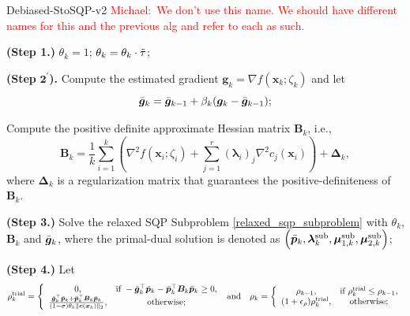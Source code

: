\documentclass[aos]{imsart}
\numberwithin{equation}{section}
\theoremstyle{plain}
\newcommand{\michael}[1]{\textcolor{red}{Michael:\ #1}}
\begin{document}
\begin{algorithm}[htb]
 \caption{Debiased-StoSQP-v2 \michael{We don't use this name. We should have different names for this and the previous alg and refer to each as such.}}
 \label{alg_stoch_relaxed_sqp_averaging_grad_Bk}
 \begin{algorithmic}[1]
 \renewcommand{\algorithmicrequire}{\textbf{Input:} $\bm{\ell} \leq \bm{x}_0 \leq \bm{u}$, $\tau, \Tilde{\tau} \in (0,1)$, $\sigma \in (0,1)$, $\rho_{-1} >0$, $\epsilon_{\rho}, \epsilon_{\xi}, \beta \in (0,1)$, $\mu \in (0,1)$, $\varrho>0$, $\{\beta_k\}_{k=0}^{\infty}$, $\{\gamma_k\}_{k=0}^{\infty}$.}
 \REQUIRE 
  \STATE \textbf{(Step 1.)} $\theta_k = 1$;
  \STATE $\theta_k = \theta_k \cdot \Tilde{\tau}$;

  \ENDWHILE

  \STATE \textbf{(Step} $\mathbf{2^{\prime}}$\textbf{).} Compute the estimated gradient $\bm{g}_k = \nabla f(\bm{x}_k; \zeta_{k})$ and let 
  \begin{equation*}
      \Bar{\bm{g}}_k = \Bar{\bm{g}}_{k-1} + \beta_k (\bm{g}_k - \Bar{\bm{g}}_{k-1});
  \end{equation*}

  \STATE Compute the positive definite approximate Hessian matrix $\bm{B}_k$, i.e., \begin{equation*}
        \bm{B}_k = \frac{1}{k} \sum_{i=1}^{k} \left( \nabla^2 f(\bm{x}_i; \zeta_{i}) + \sum_{j=1}^{r} \left( \bm{\lambda}_{i}\right)_{j}\nabla^2 c_j(\bm{x}_{i})\right) + \bm{\Delta}_k,
\end{equation*}
 where $\bm{\Delta}_k$ is a regularization matrix that guarantees the positive-definiteness of $\bm{B}_k$. 
  
  \STATE \textbf{(Step 3.)} Solve the relaxed SQP Subproblem \eqref{relaxed_sqp_subproblem} with $\theta_k$, $\bm{B}_k$ and $\Bar{\bm{g}}_{k}$, where the primal-dual solution is denoted as $\left(\Bar{\bm{p}}_k,  \bm{\lambda}_k^{\text{sub}}, \bm{\mu}_{1,k}^{\text{sub}}, \bm{\mu}_{2,k}^{\text{sub}} \right)$;

  \STATE \textbf{(Step 4.)} Let \begin{equation*}
        \rho_k^{\text{trial}} = \left \{ \begin{array}{cc}
           0,  & \text{if}~ -\Bar{\bm{g}}_k^{\top} \Bar{\bm{p}}_k - \Bar{\bm{p}}_k^{\top} \bm{B}_k \Bar{\bm{p}}_k \geq 0, \\
           \frac{\Bar{\bm{g}}_k^{\top} \Bar{\bm{p}}_k + \Bar{\bm{p}}_k^{\top} \bm{B}_k \Bar{\bm{p}}_k}{(1-\sigma)\theta_k \|\bm{c}(\bm{x}_k)\|_2},  &  \text{otherwise;}
        \end{array}\right.
        ~\text{and} \quad 
         \rho_k = \left\{ \begin{array}{cc}
        \rho_{k-1}, &  \text{if}~\rho_{k}^{\text{trial}} \leq \rho_{k-1}, \\
        (1+\epsilon_{\rho})\rho_{k}^{\text{trial}}, & \text{otherwise};
    \end{array} \right.
         \end{equation*}


\end{algorithmic}
\end{algorithm}
\end{document}
